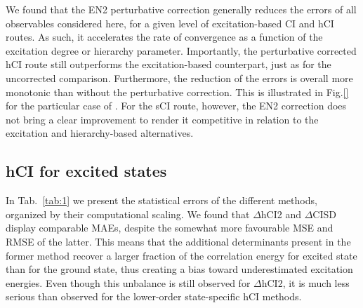 \documentclass[aip,jcp,reprint,noshowkeys,superscriptaddress]{revtex4-1}
\begin{document}
We found that the EN2 perturbative correction generally reduces the errors of all observables considered here, for a given level of excitation-based CI and hCI routes.
As such, it accelerates the rate of convergence as a function of the excitation degree or hierarchy parameter.
Importantly, the perturbative corrected hCI route still outperforms the excitation-based counterpart, just as for the uncorrected comparison.
Furthermore, the reduction of the errors is overall more monotonic than without the perturbative correction.
This is illustrated in Fig.\ref{} for the particular case of .
For the sCI route, however, the EN2 correction does not bring a clear improvement to render it competitive in relation to the excitation and hierarchy-based alternatives.


 


\subsection{hCI for excited states}
\label{sec:res_B}

In Tab.~\ref{tab:1} we present the statistical errors of the different methods, organized by their computational scaling.
We found that $\Delta$hCI2 and $\Delta$CISD display comparable MAEs, despite the somewhat more favourable MSE and RMSE of the latter.
This means that the additional determinants present in the former method recover a larger fraction of the correlation energy for excited state than for the ground state,
thus creating a bias toward underestimated excitation energies.
Even though this unbalance is still observed for $\Delta$hCI2, it is much less serious than observed for the lower-order state-specific hCI methods.
\end{document}
